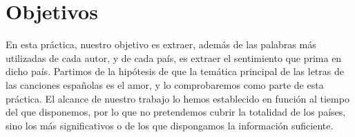 \chapter{Objetivos}
\label{cap:Objetivos}

En esta práctica, nuestro objetivo es extraer, además de las palabras más utilizadas de cada autor, y de cada país, es extraer el sentimiento que prima en dicho país. Partimos de la hipótesis de que la temática principal de las letras de las canciones españolas es el amor, y lo comprobaremos como parte de esta práctica. El alcance de nuestro trabajo lo hemos establecido en función al tiempo del que disponemos, por lo que no pretendemos cubrir la totalidad de los países, sino los más significativos o de los que dispongamos la información suficiente. 
